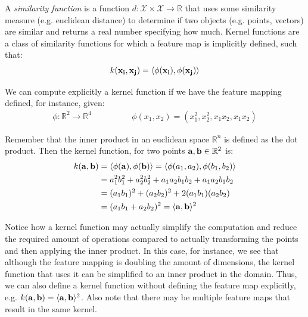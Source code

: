 A \emph{similarity function} is a function $d : \mathcal{X \times X} \rightarrow \mathbb{R}$ that uses some similarity measure (e.g. euclidean distance) to determine if two objects (e.g. points, vectors) are similar and returns a real number specifying how much. Kernel functions are a class of similarity functions for which a feature map is implicitly defined, such that:
\begin{align}
    k(\mathbf{x_i}, \mathbf{x_j}) = \langle\phi(\mathbf{x_i}), \phi(\mathbf{x_j})\rangle
\end{align}

We can compute explicitly a kernel function if we have the feature mapping defined, for instance, given:
\begin{align*}
    \phi : \mathbb{R}^2 \rightarrow \mathbb{R}^4 &
    \qquad\qquad
    \phi(x_1, x_2) = (x_1^2, x_2^2, x_1x_2, x_1x_2)
\end{align*}

Remember that the inner product in an euclidean space $\mathbb{R}^n$ is defined as the dot product. Then the kernel function, for two points $\mathbf{a}, \mathbf{b} \in \mathbb{R}^2$ is:
\begin{align*}
    k(\mathbf{a}, \mathbf{b}) &= \langle\phi(\mathbf{a}), \phi(\mathbf{b})\rangle = \langle\phi(a_1, a_2), \phi(b_1, b_2)\rangle \\
    &= a_1^2b_1^2 + a_2^2b_2^2 + a_1a_2b_1b_2 + a_1a_2b_1b_2 \\
    &= (a_1b_1)^2 + (a_2b_2)^2 + 2(a_1b_1)(a_2b_2) \\
    &= (a_1b_1 + a_2b_2)^2 = \langle\mathbf{a}, \mathbf{b}\rangle^2
\end{align*}

Notice how a kernel function may actually simplify the computation and reduce the required amount of operations compared to actually transforming the points and then applying the inner product. In this case, for in\-stance, we see that although the feature mapping is doubling the amount of di\-men\-sions, the kernel function that uses it can be simplified to an inner product in the domain. Thus, we can also define a kernel function without defining the feature map explicitly, e.g. $k(\mathbf{a}, \mathbf{b}) = \langle\mathbf{a}, \mathbf{b}\rangle^2$. Also note that there may be multiple feature maps that result in the same kernel. 

